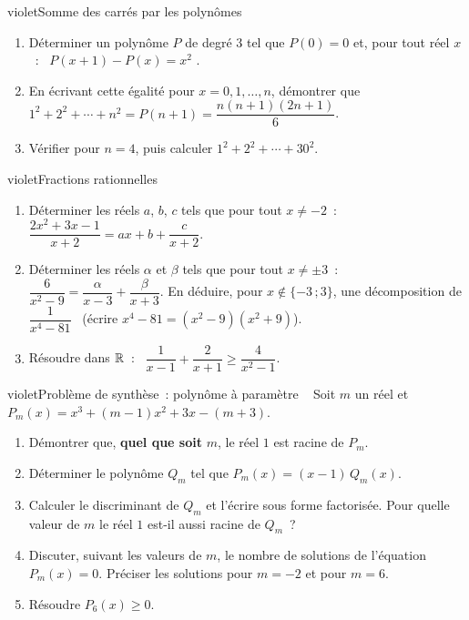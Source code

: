 \begin{exo}{violet}{Somme des carrés par les polynômes \demo\ }
\begin{enumerate}
  \item Déterminer un polynôme $P$ de degré $3$ tel que $P(0)=0$ et, pour tout réel $x$~: \ $P(x+1)-P(x)=x^2$ .
  \item En écrivant cette égalité pour $x=0,1,\dots,n$, démontrer que \ $1^2+2^2+\cdots+n^2=P(n+1)=\dfrac{n(n+1)(2n+1)}{6}$.
  \item Vérifier pour $n=4$, puis calculer $1^2+2^2+\cdots+30^2$.
\end{enumerate}
\end{exo}

\begin{exo}{violet}{Fractions rationnelles }
\begin{enumerate}
  \item Déterminer les réels $a$, $b$, $c$ tels que pour tout $x\neq-2$~: \ $\dfrac{2x^2+3x-1}{x+2}=ax+b+\dfrac{c}{x+2}$.
  \item Déterminer les réels $\alpha$ et $\beta$ tels que pour tout $x\neq\pm3$~: \ $\dfrac{6}{x^2-9}=\dfrac{\alpha}{x-3}+\dfrac{\beta}{x+3}$. En déduire, pour $x\notin\{-3\,;3\}$, une décomposition de $\dfrac{1}{x^4-81}$ \ {\small(écrire $x^4-81=(x^2-9)(x^2+9)$)}.
  \item Résoudre dans $\mathbb{R}$~: \ $\dfrac{1}{x-1}+\dfrac{2}{x+1}\geq\dfrac{4}{x^2-1}$.
\end{enumerate}
\end{exo}
\begin{exo}{violet}{Problème de synthèse~: polynôme à paramètre \demo\ }
Soit $m$ un réel et \ $P_m(x)=x^3+(m-1)x^2+3x-(m+3)$.
\begin{enumerate}
  \item Démontrer que, \textbf{quel que soit} $m$, le réel $1$ est racine de $P_m$.
  \item Déterminer le polynôme $Q_m$ tel que $P_m(x)=(x-1)\,Q_m(x)$.
  \item Calculer le discriminant de $Q_m$ et l'écrire sous forme factorisée. Pour quelle valeur de $m$ le réel $1$ est-il aussi racine de $Q_m$~?
  \item Discuter, suivant les valeurs de $m$, le nombre de solutions de l'équation $P_m(x)=0$. Préciser les solutions pour $m=-2$ et pour $m=6$.
  \item Résoudre $P_6(x)\geq0$.
\end{enumerate}
\end{exo}

